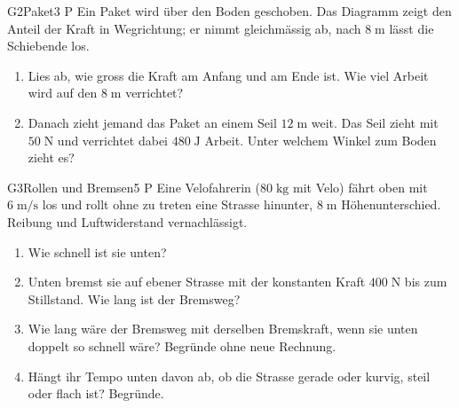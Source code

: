 \documentclass[11pt]{article}
\begin{document}
\begin{lpaufgabe}{G2}{Paket}{3 P}
Ein Paket wird über den Boden geschoben. Das Diagramm zeigt den Anteil der Kraft in Wegrichtung; er nimmt gleichmässig ab, nach \(8\;\text{m}\) lässt die Schiebende los.\par\smallskip
\begin{center}\end{center}
\begin{enumerate}[label=\alph*),leftmargin=*,itemsep=2pt,topsep=2pt]
\item Lies ab, wie gross die Kraft am Anfang und am Ende ist. Wie viel Arbeit wird auf den \(8\;\text{m}\) verrichtet?
\item Danach zieht jemand das Paket an einem Seil \(12\;\text{m}\) weit. Das Seil zieht mit \(50\;\text{N}\) und verrichtet dabei \(480\;\text{J}\) Arbeit. Unter welchem Winkel zum Boden zieht es?
\end{enumerate}
\end{lpaufgabe}


\begin{lpaufgabe}{G3}{Rollen und Bremsen}{5 P}
Eine Velofahrerin (\(80\;\text{kg}\) mit Velo) fährt oben mit \(6\;\text{m/s}\) los und rollt ohne zu treten eine Strasse hinunter, \(8\;\text{m}\) Höhenunterschied. Reibung und Luftwiderstand vernachlässigt.
\begin{enumerate}[label=\alph*),leftmargin=*,itemsep=2pt,topsep=2pt]
\item Wie schnell ist sie unten?
\item Unten bremst sie auf ebener Strasse mit der konstanten Kraft \(400\;\text{N}\) bis zum Stillstand. Wie lang ist der Bremsweg?
\item Wie lang wäre der Bremsweg mit derselben Bremskraft, wenn sie unten doppelt so schnell wäre? Begründe ohne neue Rechnung.
\item Hängt ihr Tempo unten davon ab, ob die Strasse gerade oder kurvig, steil oder flach ist? Begründe.
\end{enumerate}
\end{lpaufgabe}
\end{document}
